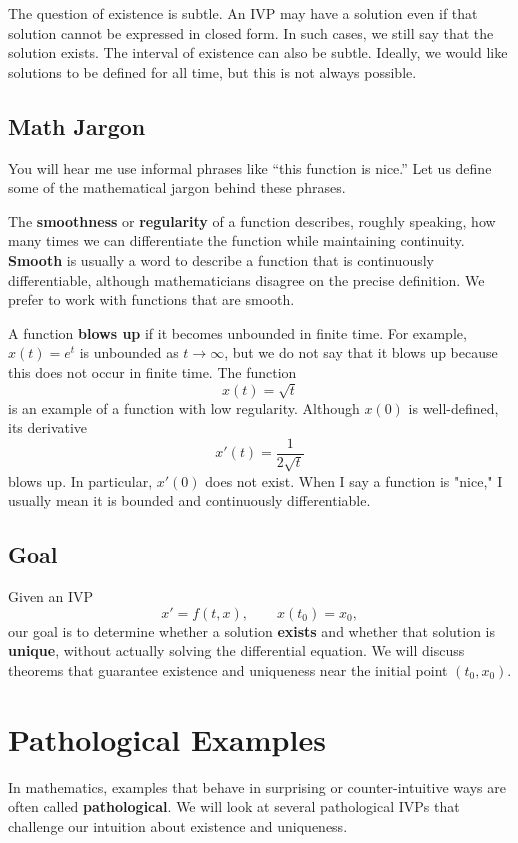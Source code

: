 \documentclass[11pt,letterpaper]{article}
\begin{document}
The question of existence is subtle. An IVP may have a solution even if that
solution cannot be expressed in closed form. In such cases, we still say that the
solution exists. The interval of existence can also be subtle. Ideally, we would like solutions to be defined for all time, but this is not always possible.

\subsection{Math Jargon}
You will hear me use informal phrases like ``this function is nice.'' Let us
define some of the mathematical jargon behind these phrases.

The \textbf{smoothness} or \textbf{regularity} of a function describes,
roughly speaking, how many times we can differentiate the function while
maintaining continuity. \textbf{Smooth} is usually a word to describe a function that is continuously differentiable, although mathematicians disagree on the precise definition. We prefer to work with functions that are smooth.

A function \textbf{blows up} if it becomes unbounded in finite time. For
example, $x(t)=e^t$ is unbounded as $t\to\infty$, but we do not say that it
blows up because this does not occur in finite time. The function
\[
x(t)=\sqrt{t}
\]
is an example of a function with low regularity. Although $x(0)$ is
well-defined, its derivative
\[
x'(t)=\frac{1}{2\sqrt{t}}
\]
blows up. In particular, $x'(0)$ does not exist. When I say a function is "nice," I usually mean it is bounded and continuously differentiable.

\subsection{Goal}

Given an IVP
\[
x'=f(t,x), \qquad x(t_0)=x_0,
\]
our goal is to determine whether a solution \textbf{exists} and whether that
solution is \textbf{unique}, without actually solving the differential
equation. We will discuss theorems that guarantee existence and
uniqueness near the initial point $(t_0,x_0)$.



\section{Pathological Examples}

In mathematics, examples that behave in surprising or counter-intuitive ways
are often called \textbf{pathological}. We will look at several pathological
IVPs that challenge our intuition about existence and uniqueness.
\end{document}
